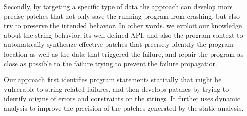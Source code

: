 Secondly, by targeting a specific type of data
the approach can develop more precise patches that not only save the running
program from crashing, but 
also try to preserve the intended behavior. In other words, we exploit our
knowledge about the string behavior, its well-defined API, and also the program
context to automatically synthesize 
effective patches that precisely identify the program location as well as the
data that triggered the failure, and 
repair the program as close as possible to the failure trying to prevent the
failure propagation.

Our approach first identifies program statements statically
that might be vulnerable to string-related failures, and then develops patches
by trying to identify origins of errors and constraints on the strings. It
further uses dynamic
analysis to improve the precision of the patches generated by the static
analysis. 



